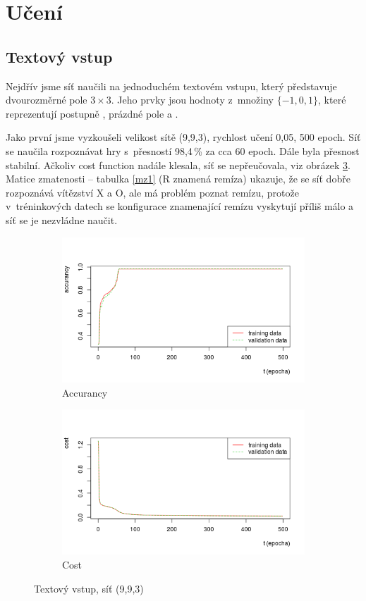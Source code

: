 \documentclass[10pt,a4paper]{article}
\begin{document}
\section*{Učení}
\subsection*{Textový vstup}
Nejdřív jsme síť naučili na jednoduchém textovém vstupu, který představuje dvourozměrné pole $3\times 3$. Jeho prvky jsou hodnoty z~množiny $\{-1,0,1\}$, které reprezentují  postupně , prázdné pole a .

Jako první jsme vyzkoušeli velikost sítě (9,9,3), rychlost učení 0,05, 500 epoch. Síť se naučila rozpoznávat hry s~přesností 98,4\,\% za cca 60 epoch. Dále byla přesnost stabilní. Ačkoliv cost function nadále klesala, síť se nepřeučovala, viz obrázek \ref{fig:1}. Matice zmatenosti -- tabulka \ref{mz1} (R znamená remíza) ukazuje, že se síť dobře rozpoznává vítězství X a O, ale má problém poznat remízu, protože v~tréninkových datech se konfigurace znamenající remízu vyskytují příliš málo a síť se je nezvládne naučit. 

\begin{figure}[h!]
\centering
\begin{subfigure}{.5\textwidth}
  \centering
  \includegraphics[width=\textwidth]{a1}
  \caption{Accurancy}
  \label{fig:a1}
\end{subfigure}%
\begin{subfigure}{.5\textwidth}
  \centering
  \includegraphics[width=\textwidth]{c1}
  \caption{Cost}
  \label{fig:c1}
\end{subfigure}
\caption{Textový vstup, síť (9,9,3)}
\label{fig:1}
\end{figure}
\end{document}
